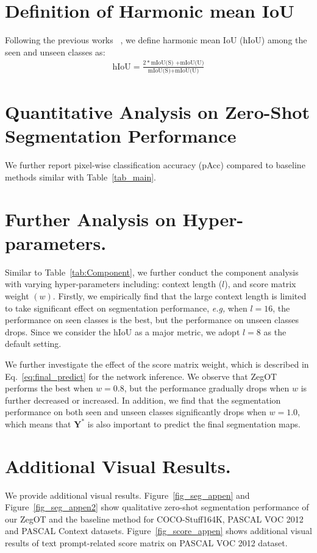 \documentclass[nohyperref]{article}
\newcommand{\asty}{{\mathbf{Y}^*}}
\theoremstyle{plain}
\theoremstyle{definition}
\theoremstyle{remark}
\begin{document}
\section{Definition of Harmonic mean IoU}
\label{appendix:hIoU}
Following the previous works ~\cite{xu2021zsseg,zhou2022maskclip,zhou2022zegclip}, we define harmonic mean IoU (hIoU) among the seen and unseen classes as:
\begin{align}
    \text{hIoU} =\frac{2 * \text{mIoU(S) +mIoU(U)}}{\text{mIoU(S)+mIoU(U)}}
\end{align}


\section{Quantitative Analysis on Zero-Shot Segmentation Performance}
\label{appendix:pAcc}
We further report pixel-wise classification accuracy (pAcc) compared to baseline methods similar with Table~\ref{tab_main}.


\section{Further Analysis on Hyper-parameters.}
\label{appendix:compo}
Similar to Table~\ref{tab:Component}, we further conduct the component analysis with varying hyper-parameters including: context length ($l$), and score matrix weight $(w)$.
Firstly, we empirically find that the large context length is limited to take %
significant effect on segmentation performance, \textit{e.g,} when $l=16$, the performance on seen classes is the best, but the performance on unseen classes drops. Since we consider the hIoU as a major metric, we adopt $l=8$ as the default setting. 

We further investigate the effect of the score matrix 
weight, which is described in Eq.~\eqref{eq:final_predict} for the network inference.
We observe that ZegOT performs the best when $w = 0.8$, but the performance gradually drops when $w$ is further decreased or increased. In addition, we find that the segmentation performance on both seen and unseen classes significantly drops when $w=1.0$, which means that $\asty$ is also important to predict the final segmentation maps. 








\section{Additional Visual Results.}
\label{appen_fig}
We provide additional visual results. Figure~\ref{fig_seg_appen} and Figure~\ref{fig_seg_appen2} show
qualitative zero-shot segmentation performance of our ZegOT and the baseline method for COCO-Stuff164K, PASCAL VOC 2012 and PASCAL Context datasets. 
Figure~\ref{fig_score_appen} shows additional visual results of text prompt-related score matrix on PASCAL VOC 2012 dataset.
\end{document}
